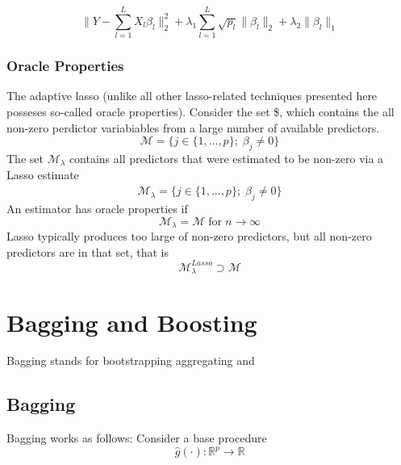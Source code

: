 \documentclass[]{book}
\begin{document}
\[ \|Y-\sum\limits_{l = 1}^L X_l\beta_l \|_2^2 + 
\lambda_1 \sum\limits_{l = 1}^L \sqrt{p_l} \|\beta_l\|_2 + 
\lambda_2 \|\beta_l \|_1\]

\subsection{Oracle Properties}\label{oracle-properties}

The adaptive lasso (unlike all other lasso-related techniques presented
here posseses so-called oracle properties). Consider the set
\$, which contains the all non-zero perdictor variabiables
from a large number of available predictors.
\[ \mathcal{M} = \{j \in \{1, ..., p\}; \; \beta_j \neq 0\}\] The set
\(\mathcal{M}_\lambda\) contains all predictors that were estimated to
be non-zero via a Lasso estimate
\[ \mathcal{M}_\lambda = \{j \in \{1, ..., p\}; \; \hat{\beta}_j \neq 0\}\]
An estimator has oracle properties if
\[ \mathcal{M}_\lambda =\mathcal{M} \; \text{for} \; n \rightarrow \infty\]
Lasso typically produces too large of non-zero predictors, but all
non-zero predictors are in that set, that is
\[  \mathcal{M}_{\lambda}^{Lasso} \supset \mathcal{M} \]

\chapter{Bagging and Boosting}\label{bagging-and-boosting}

Bagging stands for bootstrapping aggregating and

\section{Bagging}\label{bagging}

Bagging works as follows: Consider a base procedure
\[ \hat{g}(\cdot): \mathbb{R}^p \rightarrow \mathbb{R}\]
\end{document}
